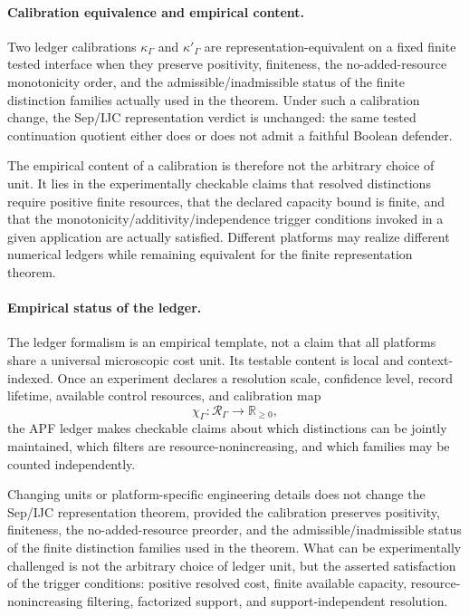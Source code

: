 \documentclass[11pt]{article}
\newcommand{\R}{\mathbb R}
\begin{document}
\paragraph{Calibration equivalence and empirical content.}
Two ledger calibrations $\kappa_\Gamma$ and $\kappa'_\Gamma$ are
representation-equivalent on a fixed finite tested interface when they
preserve positivity, finiteness, the no-added-resource monotonicity
order, and the admissible/inadmissible status of the finite distinction
families actually used in the theorem.  Under such a calibration change,
the Sep/IJC representation verdict is unchanged: the same tested
continuation quotient either does or does not admit a faithful Boolean
defender.

The empirical content of a calibration is therefore not the arbitrary
choice of unit.  It lies in the experimentally checkable claims that
resolved distinctions require positive finite resources, that the
declared capacity bound is finite, and that the
monotonicity/additivity/independence trigger conditions invoked in a
given application are actually satisfied.  Different platforms may
realize different numerical ledgers while remaining equivalent for the
finite representation theorem.

\paragraph{Empirical status of the ledger.}
The ledger formalism is an empirical template, not a claim that all
platforms share a universal microscopic cost unit.  Its testable
content is local and context-indexed.  Once an experiment declares a
resolution scale, confidence level, record lifetime, available control
resources, and calibration map
\[
    \chi_\Gamma:\mathcal R_\Gamma\to\R_{\ge 0},
\]
the APF ledger makes checkable claims about which distinctions can be
jointly maintained, which filters are resource-nonincreasing, and
which families may be counted independently.

Changing units or platform-specific engineering details does not
change the Sep/IJC representation theorem, provided the calibration
preserves positivity, finiteness, the no-added-resource preorder, and
the admissible/inadmissible status of the finite distinction families
used in the theorem.  What can be experimentally challenged is not
the arbitrary choice of ledger unit, but the asserted satisfaction of
the trigger conditions: positive resolved cost, finite available
capacity, resource-nonincreasing filtering, factorized support, and
support-independent resolution.
\end{document}
